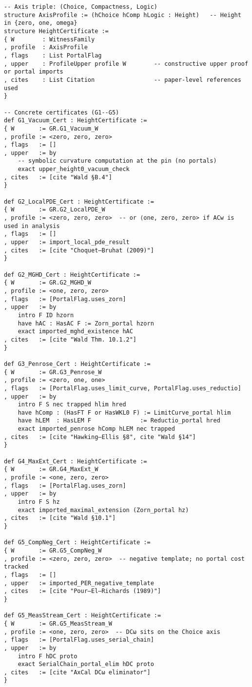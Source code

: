 \documentclass[11pt]{article}
\theoremstyle{definition}
\theoremstyle{remark}
\begin{document}
\begin{verbatim}
-- Axis triple: (Choice, Compactness, Logic)
structure AxisProfile := (hChoice hComp hLogic : Height)   -- Height in {zero, one, omega}
structure HeightCertificate :=
{ W        : WitnessFamily
, profile  : AxisProfile
, flags    : List PortalFlag
, upper    : ProfileUpper profile W        -- constructive upper proof or portal imports
, cites    : List Citation                 -- paper-level references used
}

-- Concrete certificates (G1--G5)
def G1_Vacuum_Cert : HeightCertificate :=
{ W       := GR.G1_Vacuum_W
, profile := <zero, zero, zero>
, flags   := []
, upper   := by
    -- symbolic curvature computation at the pin (no portals)
    exact upper_height0_vacuum_check
, cites   := [cite "Wald §B.4"]
}

def G2_LocalPDE_Cert : HeightCertificate :=
{ W       := GR.G2_LocalPDE_W
, profile := <zero, zero, zero>  -- or ⟨one, zero, zero> if ACw is used in analysis
, flags   := []
, upper   := import_local_pde_result
, cites   := [cite "Choquet–Bruhat (2009)"]
}

def G2_MGHD_Cert : HeightCertificate :=
{ W       := GR.G2_MGHD_W
, profile := <one, zero, zero>
, flags   := [PortalFlag.uses_zorn]
, upper   := by
    intro F ID hzorn
    have hAC : HasAC F := Zorn_portal hzorn
    exact imported_mghd_existence hAC
, cites   := [cite "Wald Thm. 10.1.2"]
}

def G3_Penrose_Cert : HeightCertificate :=
{ W       := GR.G3_Penrose_W
, profile := <zero, one, one>
, flags   := [PortalFlag.uses_limit_curve, PortalFlag.uses_reductio]
, upper   := by
    intro F S nec trapped hlim hred
    have hComp : (HasFT F or HasWKL0 F) := LimitCurve_portal hlim
    have hLEM  : HasLEM F              := Reductio_portal hred
    exact imported_penrose hComp hLEM nec trapped
, cites   := [cite "Hawking–Ellis §8", cite "Wald §14"]
}

def G4_MaxExt_Cert : HeightCertificate :=
{ W       := GR.G4_MaxExt_W
, profile := <one, zero, zero>
, flags   := [PortalFlag.uses_zorn]
, upper   := by
    intro F S hz
    exact imported_maximal_extension (Zorn_portal hz)
, cites   := [cite "Wald §10.1"]
}

def G5_CompNeg_Cert : HeightCertificate :=
{ W       := GR.G5_CompNeg_W
, profile := <zero, zero, zero>  -- negative template; no portal cost tracked
, flags   := []
, upper   := imported_PER_negative_template
, cites   := [cite "Pour–El–Richards (1989)"]
}

def G5_MeasStream_Cert : HeightCertificate :=
{ W       := GR.G5_MeasStream_W
, profile := <one, zero, zero>  -- DCω sits on the Choice axis
, flags   := [PortalFlag.uses_serial_chain]
, upper   := by
    intro F hDC proto
    exact SerialChain_portal_elim hDC proto
, cites   := [cite "AxCal DCω eliminator"]
}
\end{verbatim}
\end{document}
